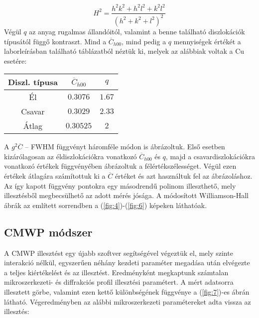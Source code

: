 \begin{multicols}{2}
\begin{equation}
H^{2}
=
\frac{h^{2} k^{2} + h^{2} l^{2} + k^{2} l^{2}}{\left( h^{2} + k^{2} + l^{2} \right)^{2}}
\end{equation}
Végül $q$ az anyag rugalmas állandóitól, valamint a benne található diszlokációk típusától függő kontraszt. Mind a $\overline{C}_{h00}$, mind pedig a $q$ mennyiségek értékét a laborleírásban található táblázatból néztük ki, melyek az alábbiak voltak a Cu esetére:
\begin{center}
\begin{tabular}{|c|c|c|}
\hline
Diszl. típusa & $\overline{C}_{h00}$ & $q$    \\ \hline\hline
Él            & $0.3076$             & $1.67$ \\
Csavar        & $0.3029$             & $2.33$ \\ \hline
Átlag         & $0.30525$            & $2$    \\ \hline
\end{tabular}
\end{center}
A $g^{2} \overline{C}$ -- FWHM függvényt háromféle módon is ábrázoltuk. Első esetben kizárólagosan az éldiszlokációkra vonatkozó $\overline{C}_{h00}$ és $q$, majd a csavardiszlokációkra vonatkozó értékek függvényében ábrázoltuk a félértékszélességet. Végül ezen értékek átlagára számítottuk ki a $\overline{C}$ értéket és azt használtuk fel az ábrázoláshoz. Az így kapott függvény pontokra egy másodrendű polinom illeszthető, mely illesztésből megbecsülhető az adott mérés jósága. A módosított Williamson-Hall ábrák az említett sorrendben a (\ref{fig:4})-(\ref{fig:6}) képeken láthatóak.

\subsection{CMWP módszer}
A CMWP illesztést egy újabb szoftver segítségével végeztük el, mely szinte interakció nélkül, egyszerűen néhány kezdeti paraméter megadása után elvégezte a teljes kiértékelést és az illesztést. Eredményként megkaptunk számtalan mikroszerkezeti- és diffrakciós profil illesztési paramétert. A mért adatsorra illesztett görbe, valamint ezen kettő különbségének függvénye a (\ref{fig:7})-es ábrán látható. Végeredményben az alábbi mikroszerkezeti paramétereket adta vissza az illesztés:


\end{multicols}
